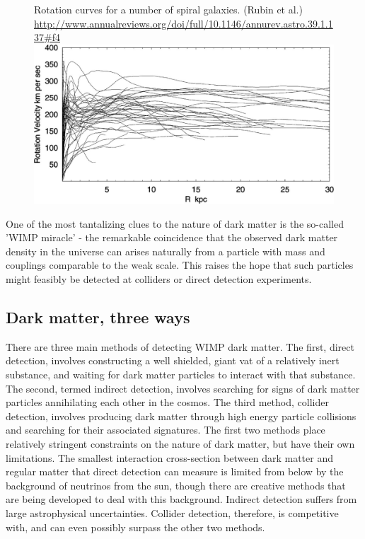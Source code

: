 \begin{figure}
  \begin{sidecaption}
    {Rotation curves for a number of spiral galaxies. (Rubin et al.) \url{http://www.annualreviews.org/doi/full/10.1146/annurev.astro.39.1.137\#f4}}
  \includegraphics[width=\textwidth]{images/rotation_curves}
\end{sidecaption}
\end{figure}
One of the most tantalizing clues to the nature of dark matter is the so-called 'WIMP miracle' - the remarkable coincidence that the observed dark matter density in the universe can arises naturally from a particle with mass and couplings comparable to the weak scale. This raises the hope that such particles might feasibly be detected at colliders or direct detection experiments.

\subsection{Dark matter, three ways}\label{dark-matter-three-ways}

There are three main methods of detecting WIMP dark matter. The first, direct detection, involves constructing a well shielded, giant vat of a relatively inert substance, and waiting for dark matter particles to interact with that substance. The second, termed indirect detection, involves searching for signs of dark matter particles annihilating each other in the cosmos. The third method, collider detection, involves producing dark matter through high energy particle collisions and searching for their associated signatures. The first two methods place relatively stringent constraints on the nature of dark matter, but have their own limitations. The smallest interaction cross-section between dark matter and regular matter that direct detection can measure is limited from below by the background of neutrinos from the sun, though there are creative methods that are being developed to deal with this background. Indirect detection suffers from large astrophysical uncertainties. Collider detection, therefore, is competitive with, and can even possibly surpass the other two methods.


